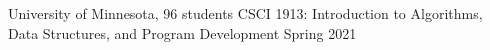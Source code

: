 
\begin{cventries}
  \cventry
    {University of Minnesota, 96 students} %
    {CSCI 1913: Introduction to Algorithms, Data Structures, and Program Development} %
    {Spring 2021} %
    {} %
    {}
\end{cventries}